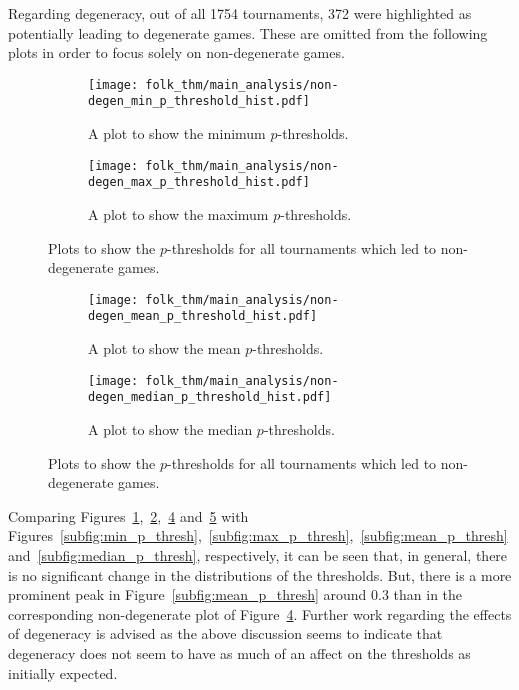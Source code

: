 Regarding degeneracy, out of all 1754 tournaments, 372 were highlighted as
potentially leading to degenerate games.
These are omitted from the following plots in order to focus solely on
non-degenerate games.

\begin{figure}
    \begin{subfigure}{.45\textwidth}
        \centering
        \texttt{[image: folk\_thm/main\_analysis/non-degen\_min\_p\_threshold\_hist.pdf]}
        \caption{A plot to show the minimum \(p\)-thresholds.}\label{subfig:non_degen_min_p_thresh}
    \end{subfigure}
    \begin{subfigure}{.45\textwidth}
        \centering
        \texttt{[image: folk\_thm/main\_analysis/non-degen\_max\_p\_threshold\_hist.pdf]}
        \caption{A plot to show the maximum \(p\)-thresholds.}\label{subfig:non_degen_max_p_thresh}
    \end{subfigure}
    \caption{Plots to show the \(p\)-thresholds for all tournaments which led to non-degenerate games.}\label{fig:non_degen_min_max_p_thresh}
\end{figure}


\begin{figure}
    \begin{subfigure}{.45\textwidth}
        \centering
        \texttt{[image: folk\_thm/main\_analysis/non-degen\_mean\_p\_threshold\_hist.pdf]}
        \caption{A plot to show the mean \(p\)-thresholds.}\label{subfig:non_degen_mean_p_thresh}
    \end{subfigure}
    \begin{subfigure}{.45\textwidth}
        \centering
        \texttt{[image: folk\_thm/main\_analysis/non-degen\_median\_p\_threshold\_hist.pdf]}
        \caption{A plot to show the median \(p\)-thresholds.}\label{subfig:non_degen_median_p_thresh}
    \end{subfigure}
    \caption{Plots to show the \(p\)-thresholds for all tournaments which led to non-degenerate games.}\label{fig:non_degen_mean_median_p_thresh}
\end{figure}

Comparing Figures~\ref{subfig:non_degen_min_p_thresh},~\ref{subfig:non_degen_max_p_thresh},~\ref{subfig:non_degen_mean_p_thresh}
and~\ref{subfig:non_degen_median_p_thresh} with 
Figures~\ref{subfig:min_p_thresh},~\ref{subfig:max_p_thresh},~\ref{subfig:mean_p_thresh}
and~\ref{subfig:median_p_thresh}, respectively, it can be seen that, in general,
there is no significant change in the distributions of the thresholds. But,
there is a more prominent peak in Figure~\ref{subfig:mean_p_thresh} around 0.3
than in the corresponding non-degenerate plot of
Figure~\ref{subfig:non_degen_mean_p_thresh}. Further work regarding the effects
of degeneracy is advised as the above discussion seems to indicate that
degeneracy does not seem to have as much of an affect on the thresholds as initially expected.


